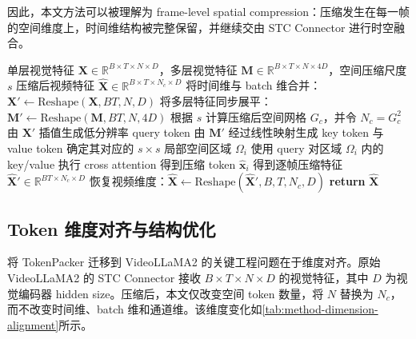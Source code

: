 \par 因此，本文方法可以被理解为 frame-level spatial compression：压缩发生在每一帧的空间维度上，时间维结构被完整保留，并继续交由 STC Connector 进行时空融合。

\begin{algorithm}[!htbp]
    \caption{\label{alg:video-tokenpacker}基于 TokenPacker 的视频视觉 token 压缩流程}
    \begin{algorithmic}[1]
        \REQUIRE 单层视觉特征 $\mathbf{X}\in\mathbb{R}^{B\times T\times N\times D}$，多层视觉特征 $\mathbf{M}\in\mathbb{R}^{B\times T\times N\times 4D}$，空间压缩尺度 $s$
        \ENSURE 压缩后视频特征 $\hat{\mathbf{X}}\in\mathbb{R}^{B\times T\times N_c\times D}$
        \STATE 将时间维与 batch 维合并：$\mathbf{X}'\leftarrow \mathrm{Reshape}(\mathbf{X}, BT,N,D)$
        \STATE 将多层特征同步展平：$\mathbf{M}'\leftarrow \mathrm{Reshape}(\mathbf{M}, BT,N,4D)$
        \STATE 根据 $s$ 计算压缩后空间网格 $G_c$，并令 $N_c=G_c^2$
        \STATE 由 $\mathbf{X}'$ 插值生成低分辨率 query token
        \STATE 由 $\mathbf{M}'$ 经过线性映射生成 key token 与 value token
            \STATE 确定其对应的 $s\times s$ 局部空间区域 $\Omega_i$
            \STATE 使用 query 对区域 $\Omega_i$ 内的 key/value 执行 cross attention
            \STATE 得到压缩 token $\hat{\mathbf{x}}_i$
        \ENDFOR
        \STATE 得到逐帧压缩特征 $\hat{\mathbf{X}}'\in\mathbb{R}^{BT\times N_c\times D}$
        \STATE 恢复视频维度：$\hat{\mathbf{X}}\leftarrow \mathrm{Reshape}(\hat{\mathbf{X}}', B,T,N_c,D)$
        \STATE \textbf{return} $\hat{\mathbf{X}}$
    \end{algorithmic}
\end{algorithm}

\subsection{Token 维度对齐与结构优化}

\par 将 TokenPacker 迁移到 VideoLLaMA2 的关键工程问题在于维度对齐。原始 VideoLLaMA2 的 STC Connector 接收 $B\times T\times N\times D$ 的视觉特征，其中 $D$ 为视觉编码器 hidden size。压缩后，本文仅改变空间 token 数量，将 $N$ 替换为 $N_c$，而不改变时间维、batch 维和通道维。该维度变化如\autoref{tab:method-dimension-alignment}所示。

